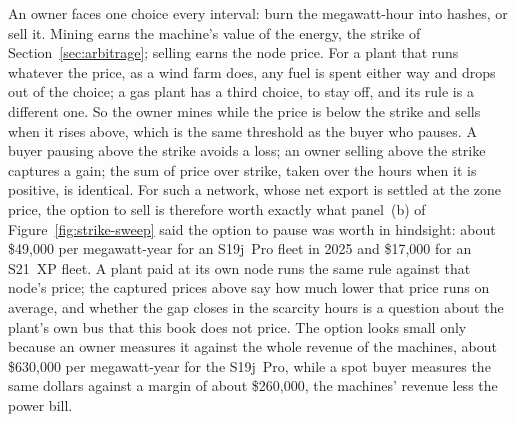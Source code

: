 An owner faces one choice every interval: burn the megawatt-hour into hashes, or sell it. Mining earns the machine's value of the energy, the strike of Section~\ref{sec:arbitrage}; selling earns the node price. For a plant that runs whatever the price, as a wind farm does, any fuel is spent either way and drops out of the choice; a gas plant has a third choice, to stay off, and its rule is a different one. So the owner mines while the price is below the strike and sells when it rises above, which is the same threshold as the buyer who pauses. A buyer pausing above the strike avoids a loss; an owner selling above the strike captures a gain; the sum of price over strike, taken over the hours when it is positive, is identical. For such a network, whose net export is settled at the zone price, the option to sell is therefore worth exactly what panel~(b) of Figure~\ref{fig:strike-sweep} said the option to pause was worth in hindsight: about \$49,000 per megawatt-year for an S19j~Pro fleet in 2025 and \$17,000 for an S21~XP fleet. A plant paid at its own node runs the same rule against that node's price; the captured prices above say how much lower that price runs on average, and whether the gap closes in the scarcity hours is a question about the plant's own bus that this book does not price. %
The option looks small only because an owner measures it against the whole revenue of the machines, about \$630,000 per megawatt-year for the S19j~Pro, while a spot buyer measures the same dollars against a margin of about \$260,000, the machines' revenue less the power bill. %


